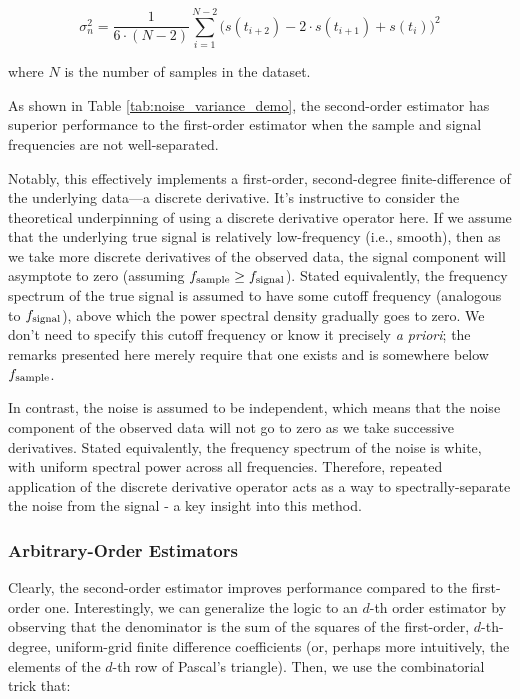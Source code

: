 \documentclass[conf]{new-aiaa}
\begin{document}
    \begin{equation}
        \sigma_n^2 = \frac{1}{6 \cdot (N-2)} \sum_{i=1}^{N-2} \Big( s(t_{i+2}) - 2 \cdot s(t_{i+1}) + s(t_i) \Big)^2
        \label{eq:2nd_order_noise_estimator}
    \end{equation}

    \noindent where $N$ is the number of samples in the dataset.

    As shown in Table \ref{tab:noise_variance_demo}, the second-order estimator has superior performance to the first-order estimator when the sample and signal frequencies are not well-separated.

    Notably, this effectively implements a first-order, second-degree finite-difference of the underlying data—a discrete derivative. It's instructive to consider the theoretical underpinning of using a discrete derivative operator here. If we assume that the underlying true signal is relatively low-frequency (i.e., smooth), then as we take more discrete derivatives of the observed data, the signal component will asymptote to zero (assuming $f_{\rm sample} \geq f_{\rm signal}$). Stated equivalently, the frequency spectrum of the true signal is assumed to have some cutoff frequency (analogous to $f_{\rm signal}$), above which the power spectral density gradually goes to zero. We don't need to specify this cutoff frequency or know it precisely \emph{a priori}; the remarks presented here merely require that one exists and is somewhere below $f_{\rm sample}$.

    In contrast, the noise is assumed to be independent, which means that the noise component of the observed data will not go to zero as we take successive derivatives. Stated equivalently, the frequency spectrum of the noise is white, with uniform spectral power across all frequencies. Therefore, repeated application of the discrete derivative operator acts as a way to spectrally-separate the noise from the signal - a key insight into this method.

    \subsubsection{Arbitrary-Order Estimators}

    Clearly, the second-order estimator improves performance compared to the first-order one. Interestingly, we can generalize the logic to an $d$-th order estimator by observing that the denominator is the sum of the squares of the first-order, $d$-th-degree, uniform-grid finite difference coefficients (or, perhaps more intuitively, the elements of the $d$-th row of Pascal's triangle). Then, we use the combinatorial trick that:
\end{document}
